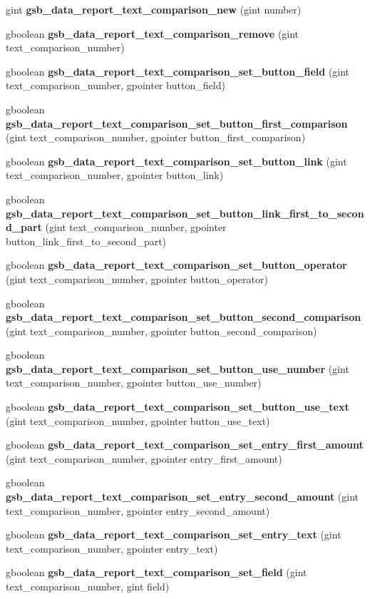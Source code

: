 \begin{DoxyCompactItemize}
gint {\bf gsb\_\-data\_\-report\_\-text\_\-comparison\_\-new} (gint number)
\item 
gboolean {\bf gsb\_\-data\_\-report\_\-text\_\-comparison\_\-remove} (gint text\_\-comparison\_\-number)
\item 
gboolean {\bf gsb\_\-data\_\-report\_\-text\_\-comparison\_\-set\_\-button\_\-field} (gint text\_\-comparison\_\-number, gpointer button\_\-field)
\item 
gboolean {\bf gsb\_\-data\_\-report\_\-text\_\-comparison\_\-set\_\-button\_\-first\_\-comparison} (gint text\_\-comparison\_\-number, gpointer button\_\-first\_\-comparison)
\item 
gboolean {\bf gsb\_\-data\_\-report\_\-text\_\-comparison\_\-set\_\-button\_\-link} (gint text\_\-comparison\_\-number, gpointer button\_\-link)
\item 
gboolean {\bf gsb\_\-data\_\-report\_\-text\_\-comparison\_\-set\_\-button\_\-link\_\-first\_\-to\_\-second\_\-part} (gint text\_\-comparison\_\-number, gpointer button\_\-link\_\-first\_\-to\_\-second\_\-part)
\item 
gboolean {\bf gsb\_\-data\_\-report\_\-text\_\-comparison\_\-set\_\-button\_\-operator} (gint text\_\-comparison\_\-number, gpointer button\_\-operator)
\item 
gboolean {\bf gsb\_\-data\_\-report\_\-text\_\-comparison\_\-set\_\-button\_\-second\_\-comparison} (gint text\_\-comparison\_\-number, gpointer button\_\-second\_\-comparison)
\item 
gboolean {\bf gsb\_\-data\_\-report\_\-text\_\-comparison\_\-set\_\-button\_\-use\_\-number} (gint text\_\-comparison\_\-number, gpointer button\_\-use\_\-number)
\item 
gboolean {\bf gsb\_\-data\_\-report\_\-text\_\-comparison\_\-set\_\-button\_\-use\_\-text} (gint text\_\-comparison\_\-number, gpointer button\_\-use\_\-text)
\item 
gboolean {\bf gsb\_\-data\_\-report\_\-text\_\-comparison\_\-set\_\-entry\_\-first\_\-amount} (gint text\_\-comparison\_\-number, gpointer entry\_\-first\_\-amount)
\item 
gboolean {\bf gsb\_\-data\_\-report\_\-text\_\-comparison\_\-set\_\-entry\_\-second\_\-amount} (gint text\_\-comparison\_\-number, gpointer entry\_\-second\_\-amount)
\item 
gboolean {\bf gsb\_\-data\_\-report\_\-text\_\-comparison\_\-set\_\-entry\_\-text} (gint text\_\-comparison\_\-number, gpointer entry\_\-text)
\item 
gboolean {\bf gsb\_\-data\_\-report\_\-text\_\-comparison\_\-set\_\-field} (gint text\_\-comparison\_\-number, gint field)

\end{DoxyCompactItemize}
